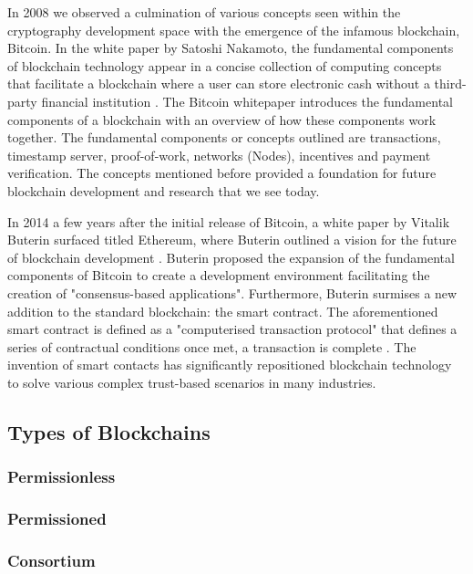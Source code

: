 In 2008 we observed a culmination of various concepts seen within the cryptography development space with the emergence of the infamous blockchain, Bitcoin. In the white paper by Satoshi Nakamoto, the fundamental components of blockchain technology appear in a concise collection of computing concepts that facilitate a blockchain where a user can store electronic cash without a third-party financial institution \autocite{nakamotoBitcoinPeertoPeerElectronic2008}. The Bitcoin whitepaper introduces the fundamental components of a blockchain with an overview of how these components work together. The fundamental components or concepts outlined are transactions, timestamp server, proof-of-work, networks (Nodes), incentives and payment verification. The concepts mentioned before provided a foundation for future blockchain development and research that we see today.\par
In 2014 a few years after the initial release of Bitcoin, a white paper by Vitalik Buterin surfaced titled Ethereum, where Buterin outlined a vision for the future of blockchain development \autocite{vitalikEthereumWhitepaper2014}. Buterin proposed the expansion of the fundamental components of Bitcoin to create a development environment facilitating the creation of "consensus-based applications". Furthermore, Buterin surmises a new addition to the standard blockchain: the smart contract. The aforementioned smart contract is defined as a "computerised transaction protocol" that defines a series of contractual conditions once met, a transaction is complete \autocite{yagaBlockchainTechnologyOverview2018}. The invention of smart contacts has significantly repositioned blockchain technology to solve various complex trust-based scenarios in many industries. 

\subsection{Types of Blockchains}

\subsubsection{Permissionless}

\subsubsection{Permissioned}

\subsubsection{Consortium}

